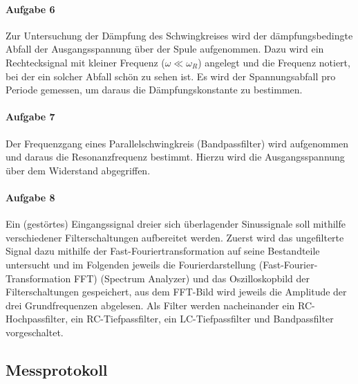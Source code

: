 \paragraph{Aufgabe 6}
Zur Untersuchung der Dämpfung des Schwingkreises wird der dämpfungsbedingte Abfall der Ausgangsspannung über der Spule aufgenommen. Dazu wird ein Rechtecksignal mit kleiner Frequenz (\(\omega\ll\omega_R\)) angelegt und die Frequenz notiert, bei der ein solcher Abfall schön zu sehen ist. Es wird der Spannungsabfall pro Periode gemessen, um daraus die Dämpfungskonstante zu bestimmen.  
\paragraph{Aufgabe 7}
Der Frequenzgang eines Parallelschwingkreis (Bandpassfilter) wird aufgenommen und daraus die Resonanzfrequenz bestimmt. Hierzu wird die Ausgangsspannung über dem Widerstand abgegriffen. 
\paragraph{Aufgabe 8}
Ein (gestörtes) Eingangssignal dreier sich überlagender Sinussignale soll mithilfe verschiedener Filterschaltungen aufbereitet werden. Zuerst wird das ungefilterte Signal dazu mithilfe der Fast-Fouriertransformation auf seine Bestandteile untersucht und im Folgenden jeweils die Fourierdarstellung (Fast-Fourier-Transformation FFT) (Spectrum Analyzer) und das Oszilloskopbild der Filterschaltungen gespeichert, aus dem FFT-Bild wird jeweils die Amplitude der drei Grundfrequenzen abgelesen. Als Filter werden nacheinander ein RC-Hochpassfilter, ein RC-Tiefpassfilter, ein LC-Tiefpassfilter und Bandpassfilter vorgeschaltet. 
\vfill
\subsection{Messprotokoll}

